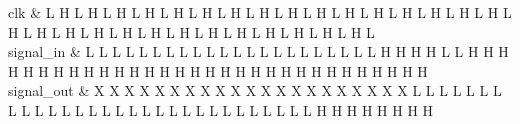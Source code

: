 \begin{tikztimingtable} [xscale=2.0]
	clk & L H L H L H L H L H L H L H L H L H L H L H L H L H L H L H L H L H L H L H L H L H L H L H L H L H L H L H L H L H L \\
	signal\_in & L L L L L L L L L L L L L L L L L L L L L L H H H H L L H H H H H H H H H H H H H H H H H H H H H H H H H H H H H H H \\
	signal\_out & X X X X X X X X X X X X X X X X X X X X X L L L L L L L L L L L L L L L L L L L L L L L L L L L L L L H H H H H H H H \\
\end{tikztimingtable}
